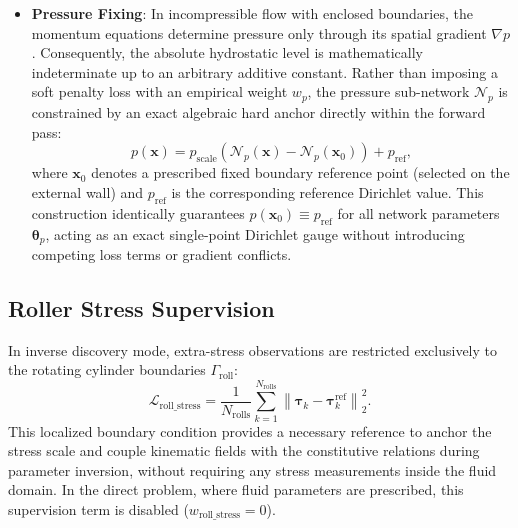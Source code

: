\begin{itemize}
\begin{equation}
            \label{eq:loss_mom_def}
        \end{equation}
    \item \textbf{Pressure Fixing}:
        In incompressible flow with enclosed boundaries, the momentum equations
        determine pressure only through its spatial gradient $\nabla p$.
        Consequently, the absolute hydrostatic level is mathematically indeterminate
        up to an arbitrary additive constant. Rather than imposing a soft penalty
        loss with an empirical weight $w_p$, the pressure sub-network $\mathcal{N}_p$
        is constrained by an exact algebraic hard anchor directly within the forward pass:
        \begin{equation}
            p(\boldsymbol{x}) = p_{\mathrm{scale}} \left( \mathcal{N}_p(\boldsymbol{x}) - \mathcal{N}_p(\boldsymbol{x}_0) \right) + p_{\mathrm{ref}} ,
            \label{eq:pressure_hard_anchor_definition}
        \end{equation}
        where $\boldsymbol{x}_0$ denotes a prescribed fixed boundary reference point
        (selected on the external wall) and $p_{\mathrm{ref}}$ is the corresponding
        reference Dirichlet value. This construction identically guarantees
        $p(\boldsymbol{x}_0) \equiv p_{\mathrm{ref}}$ for all network parameters
        $\boldsymbol{\theta}_p$, acting as an exact single-point Dirichlet gauge
        without introducing competing loss terms or gradient conflicts.
\end{itemize}



\subsection{Roller Stress Supervision}
\label{subsec:roller_stress_anchor}

In inverse discovery mode, extra-stress observations are restricted exclusively
to the rotating cylinder boundaries $\Gamma_{\mathrm{roll}}$:
\begin{equation}
    \mathcal{L}_{\mathrm{roll\_stress}} = \frac{1}{N_{\mathrm{rolls}}} \sum_{k=1}^{N_{\mathrm{rolls}}} \left\| \boldsymbol{\tau}_k - \boldsymbol{\tau}_k^{\mathrm{ref}} \right\|_2^2 .
    \label{eq:loss_roll_stress_definition}
\end{equation}
This localized boundary condition provides a necessary reference to anchor the
stress scale and couple kinematic fields with the constitutive relations during
parameter inversion, without requiring any stress measurements inside the fluid
domain. In the direct problem, where fluid parameters are prescribed, this
supervision term is disabled ($w_{\mathrm{roll\_stress}} = 0$).

